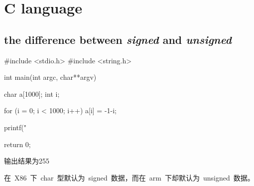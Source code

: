 \chapter{C language}

\section{the difference between \emph{signed} and \emph{unsigned}}
\begin{code}
#include <stdio.h>
#include <string.h>

int main(int argc, char**argv)
{
	char a[1000];
	int i;

	for (i = 0; i < 1000; i++)
	{
		a[i] = -1-i;
	}

	printf("%

	return 0;
}
\end{code}
输出结果为255

在~X86~下~char~型默认为~signed~数据，而在~arm~下却默认为~unsigned~数据。

